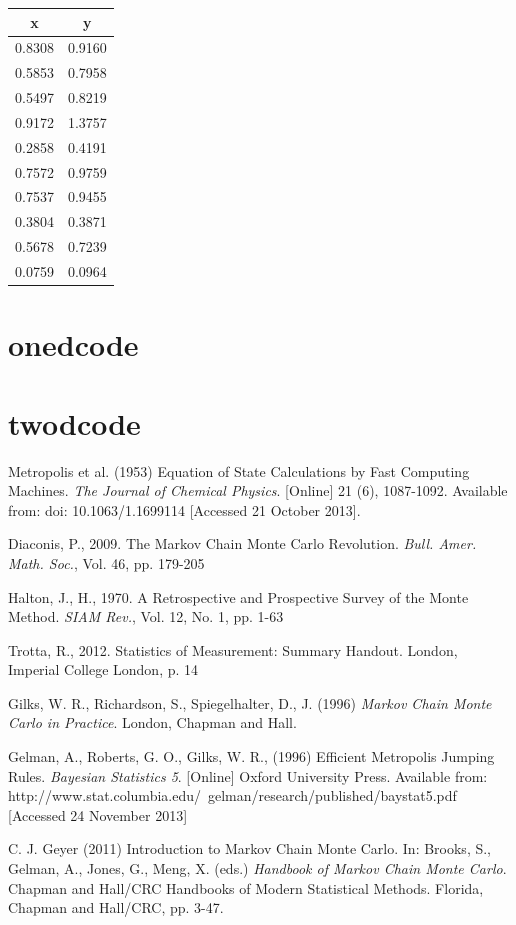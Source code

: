 \documentclass[a4paper,11pt,twoside]{article}
\begin{document}
\begin{tabular}{|c|c|}
	\hline
	x & y \\ 
	\hline 
	0.8308 & 0.9160 \\
	0.5853 & 0.7958 \\
	0.5497 & 0.8219 \\
	0.9172 & 1.3757 \\
	0.2858 & 0.4191 \\
	0.7572 & 0.9759 \\
	0.7537 & 0.9455 \\
	0.3804 & 0.3871 \\
	0.5678 & 0.7239 \\
	0.0759 & 0.0964 \\
	\hline
\end{tabular}

	


\section{onedcode} 
\label{sec:onedcode}

\section{twodcode}
\label{sec:twodcode}

\begin{thebibliography}{10}


		Metropolis et al. (1953) Equation of State Calculations by Fast
		Computing Machines. \textit{The Journal of Chemical Physics}.
		[Online] 21 (6), 1087-1092. Available from: doi:
		10.1063/1.1699114 [Accessed 21 October 2013].

		Diaconis, P., 2009. The Markov Chain Monte Carlo Revolution.
		\textit{Bull. Amer. Math. Soc.}, Vol. 46, pp. 179-205

		Halton, J., H., 1970. A Retrospective and Prospective Survey of
		the Monte Method. \textit{SIAM Rev.}, Vol. 12, No. 1, pp. 1-63
	
		Trotta, R., 2012. Statistics of Measurement: Summary Handout.
		London, Imperial College London, p. 14

		Gilks, W. R., Richardson, S., Spiegelhalter, D., J. (1996)
		\textit{Markov Chain Monte Carlo in Practice}. London, Chapman
		and Hall.
	
		Gelman, A., Roberts, G. O., Gilks, W. R., (1996) Efficient
		Metropolis Jumping Rules. \textit{Bayesian Statistics 5}. [Online]
		Oxford University Press. Available from:
		http://www.stat.columbia.edu/~gelman/research/published/baystat5.pdf
		[Accessed 24 November 2013]

		C. J. Geyer (2011) Introduction to Markov Chain Monte Carlo.
		In: Brooks, S., Gelman, A., Jones, G., Meng, X. (eds.)
		\textit{Handbook of Markov Chain Monte Carlo}. Chapman and
		Hall/CRC Handbooks of Modern Statistical Methods. Florida,
		Chapman and Hall/CRC, pp. 3-47.
	

\end{thebibliography}
\end{document}
